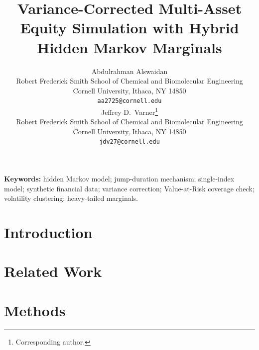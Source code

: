 \documentclass{article}
\title{Variance-Corrected Multi-Asset Equity Simulation with Hybrid Hidden Markov Marginals}
\author{%
  Abdulrahman Alswaidan \\
  Robert Frederick Smith School of Chemical and Biomolecular Engineering \\
  Cornell University, Ithaca, NY 14850 \\
  \texttt{aa2725@cornell.edu} \\
  \And
  Jeffrey D.~Varner\thanks{Corresponding author.} \\
  Robert Frederick Smith School of Chemical and Biomolecular Engineering \\
  Cornell University, Ithaca, NY 14850 \\
  \texttt{jdv27@cornell.edu} \\
}
\theoremstyle{definition}
\theoremstyle{remark}
\begin{document}
\raggedbottom
{}

\maketitle

\begin{abstract}

\end{abstract}

\vspace{0.5em}
\noindent\textbf{Keywords:} hidden Markov model; jump-duration mechanism; single-index model; synthetic financial data; variance correction; Value-at-Risk coverage check; volatility clustering; heavy-tailed marginals.

\section{Introduction}\label{sec:introduction}


\section{Related Work}\label{sec:related-work}


\section{Methods}\label{sec:method}
\end{document}
